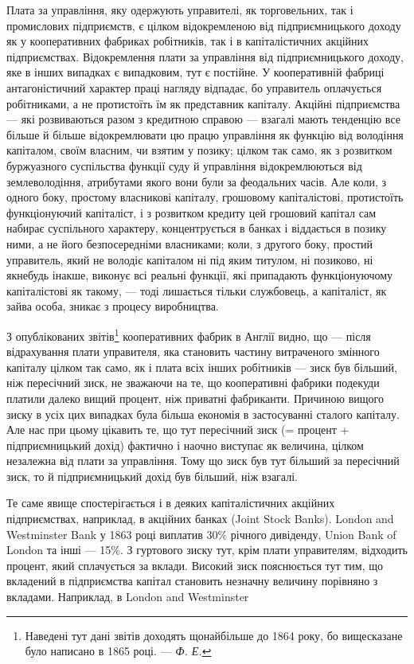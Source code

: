 
Плата за управління, яку одержують управителі, як торговельних,
так і промислових підприємств, є цілком відокремленою від
підприємницького доходу як у кооперативних фабриках робітників,
так і в капіталістичних акційних підприємствах. Відокремлення
плати за управління від підприємницького доходу, яке в інших
випадках є випадковим, тут є постійне. У кооперативній фабриці
антагоністичний характер праці нагляду відпадає, бо управитель
оплачується робітниками, а не протистоїть їм як представник
капіталу. Акційні підприємства — які розвиваються разом
з кредитною справою — взагалі мають тенденцію все більше й
більше відокремлювати цю працю управління як функцію від
володіння капіталом, своїм власним, чи взятим у позику; цілком
так само, як з розвитком буржуазного суспільства функції суду
й управління відокремлюються від землеволодіння, атрибутами
якого вони були за феодальних часів. Але коли, з одного
боку, простому власникові капіталу, грошовому капіталістові,
протистоїть функціонуючий капіталіст, і з розвитком кредиту
цей грошовий капітал сам набирає суспільного характеру, концентрується
в банках і віддається в позику ними, а не його безпосередніми
власниками; коли, з другого боку, простий
управитель, який не володіє капіталом ні під яким титулом,
ні позиково, ні якнебудь інакше, виконує всі реальні функції,
які припадають функціонуючому капіталістові як такому, — тоді
лишається тільки службовець, а капіталіст, як зайва особа,
зникає з процесу виробництва.

З опублікованих звітів\footnote{
Наведені тут дані звітів доходять щонайбільше до 1864 року, бо вищесказане
було написано в 1865 році. — \emph{Ф. Е.}
} кооперативних фабрик в Англії видно,
що — після відрахування плати управителя, яка становить частину
витраченого змінного капіталу цілком так само, як і плата
всіх інших робітників — зиск був більший, ніж пересічний зиск,
не зважаючи на те, що кооперативні фабрики подекуди платили
далеко вищий процент, ніж приватні фабриканти. Причиною
вищого зиску в усіх цих випадках була більша економія
в застосуванні сталого капіталу. Але нас при цьому цікавить те,
що тут пересічний зиск (= процент + підприємницький дохід)
фактично і наочно виступає як величина, цілком незалежна від
плати за управління. Тому що зиск був тут більший за пересічний
зиск, то й підприємницький дохід був більший, ніж взагалі.

Те саме явище спостерігається і в деяких капіталістичних акційних
підприємствах, наприклад, в акційних банках (Joint Stock
Banks). London and Westminster Bank у 1863 році виплатив 30\%
річного дивіденду, Union Bank of London та інші — 15\%. З гуртового
зиску тут, крім плати управителям, відходить процент,
який сплачується за вклади. Високий зиск пояснюється тут тим,
що вкладений в підприємства капітал становить незначну величину
порівняно з вкладами. Наприклад, в London and Westminster
\parbreak{}  %

